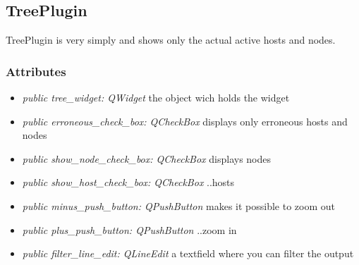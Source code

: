 \subsection{TreePlugin}
TreePlugin is very simply and shows only the actual active hosts
and nodes.
\subsubsection{Attributes}
\begin{itemize}
  \item \textit{public tree\_widget: QWidget}
  the object wich holds the widget
  \item \textit{public erroneous\_check\_box: QCheckBox}
  displays only erroneous hosts and nodes
  \item \textit{public show\_node\_check\_box: QCheckBox}
  displays nodes
  \item \textit{public show\_host\_check\_box: QCheckBox}
  ..hosts
  \item \textit{public minus\_push\_button: QPushButton}
  makes it possible to zoom out
  \item \textit{public plus\_push\_button: QPushButton}
  ..zoom in
  \item \textit{public filter\_line\_edit: QLineEdit}
  a textfield where you can filter the output
\end{itemize}

